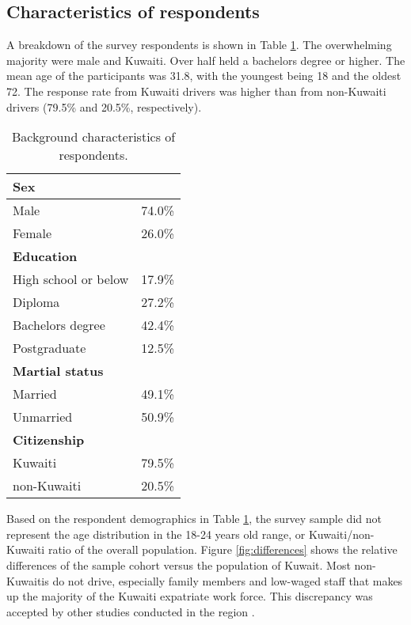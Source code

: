 \documentclass[preprint,12pt,a4paper,authoryear]{elsarticle}
\begin{document}
\subsection{Characteristics of respondents}

A breakdown of the survey respondents is shown in Table \ref{tb:respondents}.  The overwhelming majority were male and Kuwaiti. Over half held a bachelors degree or higher.  The mean age of the participants was 31.8, with the youngest being 18 and the oldest 72. The response rate from Kuwaiti drivers was higher than from non-Kuwaiti drivers (79.5\% and 20.5\%, respectively). 

\begin{table}[H]
\centering
\caption{Background characteristics of respondents.}
\label{tb:respondents}
\begin{tabular}{@{}lc@{}}
\toprule
\textbf{Sex} &  \\ \midrule
Male & 74.0\% \\
Female & 26.0\% \\ \midrule
\textbf{Education} &  \\ \midrule
High school or below & 17.9\% \\
Diploma & 27.2\% \\
Bachelors degree & 42.4\% \\
Postgraduate & 12.5\% \\ \midrule
\textbf{Martial status} &  \\ \midrule
Married & 49.1\% \\
Unmarried & 50.9\% \\ \midrule
\textbf{Citizenship} &  \\ \midrule
Kuwaiti & 79.5\% \\
non-Kuwaiti & 20.5\% \\ \bottomrule
\end{tabular}
\end{table}

 Based on the respondent demographics in Table \ref{tb:respondents}, the survey sample did not represent the age distribution in the 18-24 years old range, or Kuwaiti/non-Kuwaiti ratio of the overall population.  Figure \ref{fig:differences} shows the relative differences of the sample cohort versus the population of Kuwait. Most non-Kuwaitis do not drive, especially family members and low-waged staff that makes up the majority of the Kuwaiti expatriate work force. This discrepancy was accepted by other studies conducted in the region \citep{Bener2008}. 
 
\end{document}
